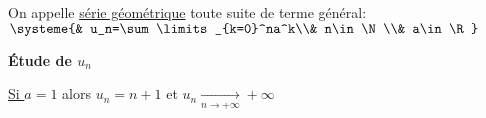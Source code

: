 \documentclass[12pt,twoside,a4paper]{article}
\begin{document}
		\begin{defi}
			On appelle \underline{série géométrique} toute suite de terme général:\\
			$\systeme{& u_n=\sum\limits_{k=0}^na^k\\& n\in\N\\& a\in\R}$
		\end{defi}
		\begin{flushleft}
			\textbf{Étude de $u_n$}\\
			\begin{liste}
				\item \underline{Si $a=1$} alors $u_n=n+1$ et $u_n\mathop{\longrightarrow}\limits_{n\rightarrow+\infty}+\infty$
			\end{liste}
		\end{flushleft}
\end{document}
